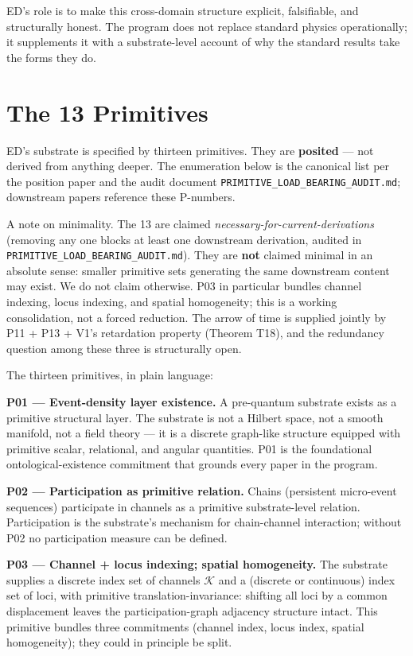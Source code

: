 \documentclass[11pt,a4paper]{article}
\begin{document}
ED's role is to make this cross-domain structure explicit, falsifiable, and structurally honest. The program does not replace standard physics operationally; it supplements it with a substrate-level account of why the standard results take the forms they do.

\section{The 13 Primitives}

ED's substrate is specified by thirteen primitives. They are \textbf{posited} --- not derived from anything deeper. The enumeration below is the canonical list per the position paper and the audit document \texttt{PRIMITIVE\_LOAD\_BEARING\_AUDIT.md}; downstream papers reference these P-numbers.

A note on minimality. The 13 are claimed \emph{necessary-for-current-derivations} (removing any one blocks at least one downstream derivation, audited in \texttt{PRIMITIVE\_LOAD\_BEARING\_AUDIT.md}). They are \textbf{not} claimed minimal in an absolute sense: smaller primitive sets generating the same downstream content may exist. We do not claim otherwise. P03 in particular bundles channel indexing, locus indexing, and spatial homogeneity; this is a working consolidation, not a forced reduction. The arrow of time is supplied jointly by P11 + P13 + V1's retardation property (Theorem T18), and the redundancy question among these three is structurally open.

The thirteen primitives, in plain language:

\textbf{P01 --- Event-density layer existence.} A pre-quantum substrate exists as a primitive structural layer. The substrate is not a Hilbert space, not a smooth manifold, not a field theory --- it is a discrete graph-like structure equipped with primitive scalar, relational, and angular quantities. P01 is the foundational ontological-existence commitment that grounds every paper in the program.

\textbf{P02 --- Participation as primitive relation.} Chains (persistent micro-event sequences) participate in channels as a primitive substrate-level relation. Participation is the substrate's mechanism for chain-channel interaction; without P02 no participation measure can be defined.

\textbf{P03 --- Channel + locus indexing; spatial homogeneity.} The substrate supplies a discrete index set of channels $\mathcal{K}$ and a (discrete or continuous) index set of loci, with primitive translation-invariance: shifting all loci by a common displacement leaves the participation-graph adjacency structure intact. This primitive bundles three commitments (channel index, locus index, spatial homogeneity); they could in principle be split.
\end{document}
